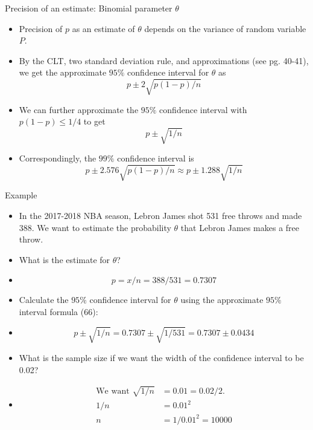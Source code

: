 \documentclass[10pt, xcolor=table]{beamer}
\begin{document}
\begin{frame}{Precision of an estimate: Binomial parameter $\theta$}
\begin{itemize}\itemsep3ex
\item<1-> Precision of $p$ as an estimate of $\theta$ depends on the variance of random variable $P$.
\item<2-> By the CLT, two standard deviation rule, and approximations (see pg. 40-41), we get the approximate {\color{blue} $95\%$ confidence interval} for $\theta$ as
\[
p \pm 2\sqrt{p(1-p)/n}
\]
\item<3-> We can further approximate the $95\%$ confidence interval with $p(1-p) \leq 1/4$ to get
\begin{equation}
p \pm \sqrt{1/n} \tag{66}
\end{equation}
\item<4-> Correspondingly, the $99\%$ confidence interval is
\[
p \pm 2.576\sqrt{p(1-p)/n} \approx p \pm 1.288\sqrt{1/n}
\]
\end{itemize}
\end{frame}

\begin{frame}{Example}
\begin{itemize}
\setlength{\itemsep}{10pt}
\item<1->[] In the 2017-2018 NBA season, Lebron James shot 531 free throws and made 388. We want to estimate the probability $\theta$ that Lebron James makes a free throw. 
\item<2->[Q1:] What is the estimate for $\theta$?
\item<3->[] {\color{red}
\vspace*{-0.5cm}
\[
p = x/n = 388/531 = 0.7307
\]
}
\vspace*{-0.5cm}
\item<4->[Q2:] Calculate the $95\%$ confidence interval for $\theta$ using the approximate $95\%$ interval formula (66):
\item<5->[] {\color{red}
\vspace*{-0.5cm}
\[
p \pm \sqrt{1/n} = 0.7307 \pm \sqrt{1/531} = 0.7307 \pm 0.0434
\]
}
\vspace*{-0.5cm}
\item<6->[Q3:] What is the sample size if we want the width of the confidence interval to be 0.02?
\item<7->[] {\color{red}
\vspace*{-0.5cm}
\begin{align*}
\text{We want } \sqrt{1/n} &= 0.01 = 0.02/2.\\
1/n &= 0.01^2\\
n &= 1/0.01^2 = 10000
\end{align*}
}
\vspace*{-0.5cm}
\end{itemize}
\end{frame}
\end{document}
